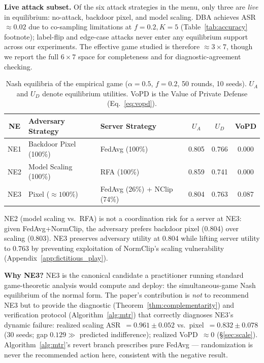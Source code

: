\documentclass{article}
\begin{document}
\textbf{Live attack subset.} Of the six attack strategies in the menu, only three are \emph{live} in equilibrium: no-attack, backdoor pixel, and model scaling. DBA achieves ASR ${\approx}0.02$ due to co-sampling limitations at $f=0.2, K=5$ (Table~\ref{tab:accuracy} footnote); label-flip and edge-case attacks never enter any equilibrium support across our experiments. The effective game studied is therefore ${\approx}3 \times 7$, though we report the full $6 \times 7$ space for completeness and for diagnostic-agreement checking.

\begin{table}[t]
\caption{Nash equilibria of the empirical game ($\alpha=0.5$, $f=0.2$, 50 rounds, 10 seeds). $U_A$ and $U_D$ denote equilibrium utilities. VoPD is the Value of Private Defense (Eq.~\ref{eq:vopd}).}
\label{tab:equilibria}
\centering
\small
\begin{tabular}{c|ll|cc|c}
\toprule
\textbf{NE} & \textbf{Adversary Strategy} & \textbf{Server Strategy} & $U_A$ & $U_D$ & VoPD \\
\midrule
NE1 & Backdoor Pixel (100\%) & FedAvg (100\%) & 0.805 & 0.766 & 0.000 \\
NE2 & Model Scaling (100\%) & RFA (100\%) & 0.859 & 0.741 & 0.000 \\
NE3 & Pixel (${\approx}100\%$) & FedAvg (26\%) + NClip (74\%) & 0.804 & 0.763 & 0.087 \\
\bottomrule
\end{tabular}
\end{table}

NE2 (model scaling vs.\ RFA) is not a coordination risk for a server at NE3: given FedAvg+NormClip, the adversary prefers backdoor pixel (0.804) over scaling (0.803). NE3 preserves adversary utility at 0.804 while lifting server utility to 0.763 by preventing exploitation of NormClip's scaling vulnerability (Appendix~\ref{app:fictitious_play}).

\textbf{Why NE3?} NE3 is the canonical candidate a practitioner running standard game-theoretic analysis would compute and deploy: the simultaneous-game Nash equilibrium of the normal form. The paper's contribution is \emph{not} to recommend NE3 but to provide the diagnostic (Theorem~\ref{thm:complementarity}) and verification protocol (Algorithm~\ref{alg:mtr}) that correctly diagnoses NE3's dynamic failure: realized scaling ASR~$= 0.961 \pm 0.052$ vs.\ pixel~$= 0.832 \pm 0.078$ (30 seeds; gap $0.129 \gg$ predicted indifference); realized VoPD~$\approx 0$ (§\ref{sec:scale}). Algorithm~\ref{alg:mtr}'s revert branch prescribes pure FedAvg --- randomization is never the recommended action here, consistent with the negative result.
\end{document}
